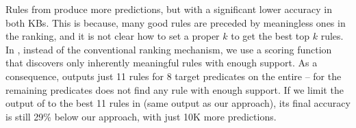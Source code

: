 Rules from \amie produce more predictions, but with a significant lower accuracy in both KBs. This is because, many good rules are preceded by meaningless ones in the ranking, and it is not clear how to set a proper $k$ to get the best top $k$ rules. 
In \krd, instead of the conventional ranking mechanism, we use a scoring function that discovers only inherently meaningful rules with enough support. 
%
As a consequence, \krd outputs just 11 rules for 8 target predicates on the entire \yago -- for the remaining predicates \krd does not find any rule with enough support. If we limit the output of \amie to the best 11 rules in \yago (same output as our approach), its final accuracy is still 29\% below our approach, with just 10K more predictions.





